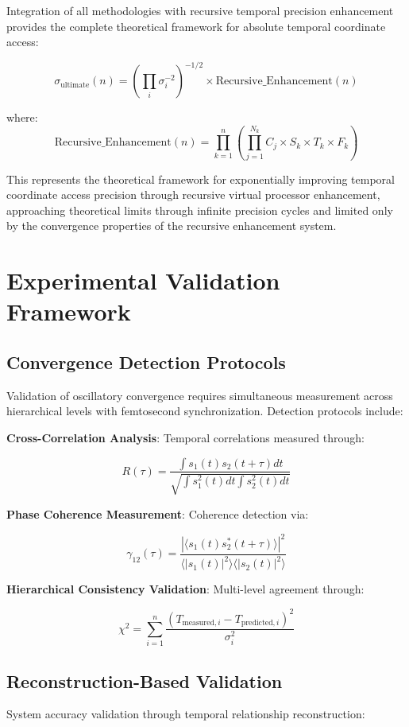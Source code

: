 \documentclass[11pt]{article}
\theoremstyle{remark}
\begin{document}
Integration of all methodologies with recursive temporal precision enhancement provides the complete theoretical framework for absolute temporal coordinate access:

$$\sigma_{\text{ultimate}}(n) = \left(\prod_{i} \sigma_i^{-2}\right)^{-1/2} \times \text{Recursive\_Enhancement}(n)$$

where:
$$\text{Recursive\_Enhancement}(n) = \prod_{k=1}^{n} \left(\prod_{j=1}^{N_k} C_j \times S_k \times T_k \times F_k\right)$$

This represents the theoretical framework for exponentially improving temporal coordinate access precision through recursive virtual processor enhancement, approaching theoretical limits through infinite precision cycles and limited only by the convergence properties of the recursive enhancement system.

\section{Experimental Validation Framework}

\subsection{Convergence Detection Protocols}

Validation of oscillatory convergence requires simultaneous measurement across hierarchical levels with femtosecond synchronization. Detection protocols include:

\textbf{Cross-Correlation Analysis}: Temporal correlations measured through:

$$R(\tau) = \frac{\int s_1(t)s_2(t+\tau) dt}{\sqrt{\int s_1^2(t) dt \int s_2^2(t) dt}}$$

\textbf{Phase Coherence Measurement}: Coherence detection via:

$$\gamma_{12}(\tau) = \frac{|\langle s_1(t)s_2^*(t+\tau)\rangle|^2}{\langle |s_1(t)|^2\rangle\langle |s_2(t)|^2\rangle}$$

\textbf{Hierarchical Consistency Validation}: Multi-level agreement through:

$$\chi^2 = \sum_{i=1}^{n} \frac{(T_{\text{measured},i} - T_{\text{predicted},i})^2}{\sigma_i^2}$$

\subsection{Reconstruction-Based Validation}

System accuracy validation through temporal relationship reconstruction:
\end{document}
